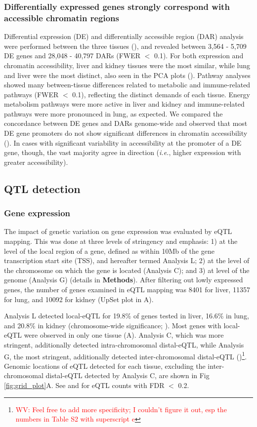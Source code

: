 \documentclass[10pt,letterpaper]{article}
\newcommand{\ie}{\emph{i.e.}\xspace}
\newcommand{\WV}[2]{\textcolor{red}{#1\footnote{\textcolor{red}{WV: #2}}}}
\begin{document}
\subsubsection*{Differentially expressed genes strongly correspond with accessible chromatin regions} 
Differential expression (DE) and differentially accessible region (DAR) analysis were performed between the three tissues (), and revealed between 3,564 - 5,709 DE genes and 28,048 - 40,797 DARs (FWER $<$ 0.1). For both expression and chromatin accessibility, liver and kidney tissues were the most similar, while lung and liver were the most distinct, also seen in the PCA plots (). Pathway analyses showed many between-tissue differences related to metabolic and immune-related pathways (FWER $<$ 0.1), reflecting the distinct demands of each tissue. Energy metabolism pathways were more active in liver and kidney and immune-related pathways were more pronounced in lung, as expected. We compared the concordance between DE genes and DARs genome-wide and observed that most DE gene promoters do not show significant differences in chromatin accessibility (). In cases with significant variability in accessibility at the promoter of a DE gene, though, the vast majority agree in direction (\ie, higher expression with greater accessibility).

\subsection*{QTL detection}

\subsubsection*{Gene expression}
The impact of genetic variation on gene expression was evaluated by eQTL mapping. This was done at three levels of stringency and emphasis: 1) at the level of the local region of a gene, defined as within 10Mb of the gene transcription start site (TSS), and hereafter termed Analysis L; 2) at the level of the chromosome on which the gene is located (Analysis C); and 3) at level of the genome (Analysis G) (details in \textbf{Methods}).
After filtering out lowly expressed genes, the number of genes examined in eQTL mapping was 8401 for liver, 11357 for lung, and 10092 for kidney (UpSet plot \cite{Conway2017} in A).

Analysis L detected local-eQTL for 19.8\% of genes tested in liver, 16.6\% in lung, and 20.8\% in kidney (chromosome-wide significance; ).
Most genes with local-eQTL were observed in only one tissue (A).
Analysis C, which was more stringent, additionally detected intra-chromosomal distal-eQTL, while Analysis G, the most stringent, additionally detected inter-chromosomal distal-eQTL ()\WV{}{Feel free to add more specificity; I couldn't figure it out, esp the numbers in Table S2 with superscript e}.
Genomic locations of eQTL detected for each tissue, excluding the inter-chromosomal distal-eQTL detected by Analysis C, are shown in Fig \ref{fig:grid_plot}A. See  and  for eQTL counts with FDR $<$ 0.2.
\end{document}
